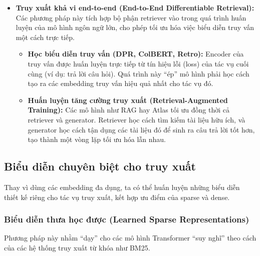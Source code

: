 \begin{itemize}
\begin{itemize}
		\item \textbf{Học phân cấp (Hierarchical RL):}
		Sử dụng một kiến trúc RL đa tầng. Một “meta-agent” cấp cao sẽ quyết định \textit{loại} chiến lược viết lại cần dùng (ví dụ: mở rộng từ đồng nghĩa, thêm bộ lọc, hay phân rã câu hỏi), trong khi một agent cấp thấp sẽ thực thi chi tiết chiến lược đó.
	\end{itemize}
	
	\item \textbf{Truy xuất khả vi end-to-end (End-to-End Differentiable Retrieval):}
	Các phương pháp này tích hợp bộ phận retriever vào trong quá trình huấn luyện của mô hình ngôn ngữ lớn, cho phép tối ưu hóa việc biểu diễn truy vấn một cách trực tiếp.
	\begin{itemize}
		\item \textbf{Học biểu diễn truy vấn (DPR, ColBERT, Retro):}
		Encoder của truy vấn được huấn luyện trực tiếp từ tín hiệu lỗi (loss) của tác vụ cuối cùng (ví dụ: trả lời câu hỏi). Quá trình này “ép” mô hình phải học cách tạo ra các embedding truy vấn hiệu quả nhất cho tác vụ đó.
		\item \textbf{Huấn luyện tăng cường truy xuất (Retrieval-Augmented Training):}
		Các mô hình như RAG hay Atlas tối ưu đồng thời cả retriever và generator. Retriever học cách tìm kiếm tài liệu hữu ích, và generator học cách tận dụng các tài liệu đó để sinh ra câu trả lời tốt hơn, tạo thành một vòng lặp tối ưu hóa lẫn nhau.
	\end{itemize}
\end{itemize}

\subsection{Biểu diễn chuyên biệt cho truy xuất}
\label{ssec:retriever_specific_embeddings}
Thay vì dùng các embedding đa dụng, ta có thể huấn luyện những biểu diễn thiết kế riêng cho tác vụ truy xuất, kết hợp ưu điểm của sparse và dense.

\subsubsection{Biểu diễn thưa học được (Learned Sparse Representations)}
\label{sssec:splade}
Phương pháp này nhằm “dạy” cho các mô hình Transformer “suy nghĩ” theo cách của các hệ thống truy xuất từ khóa như BM25.
